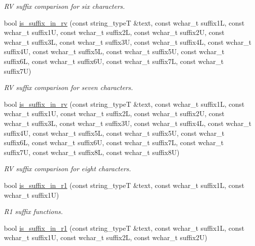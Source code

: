 \begin{DoxyCompactItemize}
\begin{DoxyCompactList}\small\item\em R\-V suffix comparison for six characters. \end{DoxyCompactList}\item 
\hypertarget{group___stemming_gabd6431b54fc5175c29809c627c44a587}{bool \hyperlink{group___stemming_gabd6431b54fc5175c29809c627c44a587}{is\-\_\-suffix\-\_\-in\-\_\-rv} (const string\-\_\-type\-T \&text, const wchar\-\_\-t suffix1\-L, const wchar\-\_\-t suffix1\-U, const wchar\-\_\-t suffix2\-L, const wchar\-\_\-t suffix2\-U, const wchar\-\_\-t suffix3\-L, const wchar\-\_\-t suffix3\-U, const wchar\-\_\-t suffix4\-L, const wchar\-\_\-t suffix4\-U, const wchar\-\_\-t suffix5\-L, const wchar\-\_\-t suffix5\-U, const wchar\-\_\-t suffix6\-L, const wchar\-\_\-t suffix6\-U, const wchar\-\_\-t suffix7\-L, const wchar\-\_\-t suffix7\-U)}\label{group___stemming_gabd6431b54fc5175c29809c627c44a587}

\begin{DoxyCompactList}\small\item\em R\-V suffix comparison for seven characters. \end{DoxyCompactList}\item 
\hypertarget{group___stemming_ga553b6ed34e6b03e2c1ca42ea2db08ba6}{bool \hyperlink{group___stemming_ga553b6ed34e6b03e2c1ca42ea2db08ba6}{is\-\_\-suffix\-\_\-in\-\_\-rv} (const string\-\_\-type\-T \&text, const wchar\-\_\-t suffix1\-L, const wchar\-\_\-t suffix1\-U, const wchar\-\_\-t suffix2\-L, const wchar\-\_\-t suffix2\-U, const wchar\-\_\-t suffix3\-L, const wchar\-\_\-t suffix3\-U, const wchar\-\_\-t suffix4\-L, const wchar\-\_\-t suffix4\-U, const wchar\-\_\-t suffix5\-L, const wchar\-\_\-t suffix5\-U, const wchar\-\_\-t suffix6\-L, const wchar\-\_\-t suffix6\-U, const wchar\-\_\-t suffix7\-L, const wchar\-\_\-t suffix7\-U, const wchar\-\_\-t suffix8\-L, const wchar\-\_\-t suffix8\-U)}\label{group___stemming_ga553b6ed34e6b03e2c1ca42ea2db08ba6}

\begin{DoxyCompactList}\small\item\em R\-V suffix comparison for eight characters. \end{DoxyCompactList}\item 
bool \hyperlink{group___stemming_gaefe544e653b27bd5c1fab7b5a18d80a1}{is\-\_\-suffix\-\_\-in\-\_\-r1} (const string\-\_\-type\-T \&text, const wchar\-\_\-t suffix1\-L, const wchar\-\_\-t suffix1\-U)
\begin{DoxyCompactList}\small\item\em R1 suffix functions. \end{DoxyCompactList}\item 
\hypertarget{group___stemming_gab8cb2e00b39091f74b1064e1f0314c6f}{bool \hyperlink{group___stemming_gab8cb2e00b39091f74b1064e1f0314c6f}{is\-\_\-suffix\-\_\-in\-\_\-r1} (const string\-\_\-type\-T \&text, const wchar\-\_\-t suffix1\-L, const wchar\-\_\-t suffix1\-U, const wchar\-\_\-t suffix2\-L, const wchar\-\_\-t suffix2\-U)}\label{group___stemming_gab8cb2e00b39091f74b1064e1f0314c6f}


\end{DoxyCompactItemize}
